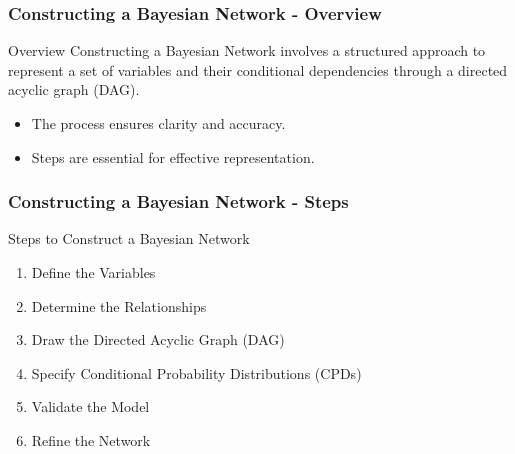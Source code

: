 \documentclass[aspectratio=169]{beamer}
\begin{document}
\begin{frame}[fragile]
    \frametitle{Constructing a Bayesian Network - Overview}
    \begin{block}{Overview}
        Constructing a Bayesian Network involves a structured approach to represent a set of variables and their conditional dependencies through a directed acyclic graph (DAG).
        \begin{itemize}
            \item The process ensures clarity and accuracy.
            \item Steps are essential for effective representation.
        \end{itemize}
    \end{block}
\end{frame}

\begin{frame}[fragile]
    \frametitle{Constructing a Bayesian Network - Steps}
    \begin{block}{Steps to Construct a Bayesian Network}
        \begin{enumerate}
            \item Define the Variables
            \item Determine the Relationships
            \item Draw the Directed Acyclic Graph (DAG)
            \item Specify Conditional Probability Distributions (CPDs)
            \item Validate the Model
            \item Refine the Network
        \end{enumerate}
    \end{block}
\end{frame}
\end{document}

